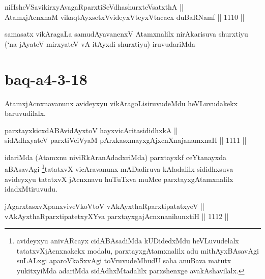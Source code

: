 
\begin{shl}
niHsheVSavikirxyAvagaRparxtiSeVdhashurxteVsatxthA || \\
AtamxjAcnxnaM vikaqtAyx\s \s setxV\s videyxVteyxVtacacx duBaRNamf \hfill || 1110 ||  
\end{shl}

\begin{artha}
samasatx vikAragaLa samudAyavanenxV Atamxnalilx nirAkarisuva shurxtiyu (`na jAyateV mirxyateV vA itAyxdi shurxtiyu) iruvudariMda
\end{artha}

\section*{baq-a4-3-18}

\begin{artha}
AtamxjAcnxnavanunx avideyxyu vikAragoLisiruvudeMdu heVLuvudakekx baruvudilalx.
\end{artha}


\begin{shl}
parxtayxkicxdABAvidAyx\s toV hayxvicAritasididhxkA || \\
sidAdhxyateV parxtiVciVyaM pArxkasxmayxgAjxcnXnajanamxnaH \hfill || 1111 || 
\end{shl}

\begin{artha}
idariMda (Atamxnu niviRkAranAdadxriMda) parxtayxkf ceYtanayxda aBAsavAgi \footnote{avideyxyu anivARcayx cidABAsadiMda kUDidedxMdu heVLuvudelalx tatatxvXjAcnxnakekx modalu, parxtayxgAtamxnalilx adu mithAyxBAsavAgi suLALxgi aparoVkaSxvAgi toVruvudeMbudU saha anuBava matutx yukitxyiMda adariMda sidAdhxMtadalilx parxshenxge avakAshavilalx.}tatatxvX vicAravanunx mADadiruva kAladalilx sididhxsuva avideyxyu tatatxvX jAcnxnavu huTuTxva muMce parxtayxgAtamxnalilx idadxMtiruvudu.
\end{artha}


\begin{shl}
jAgarxtasxvXpanxviveVkoV\s toV vAkAyxthaRparxtipatatxyeV || \\
vAkAyxthaRparxtipatetxyXYva parxtayxgajAcnxnanihunxtiH \hfill || 1112 ||  
\end{shl}

